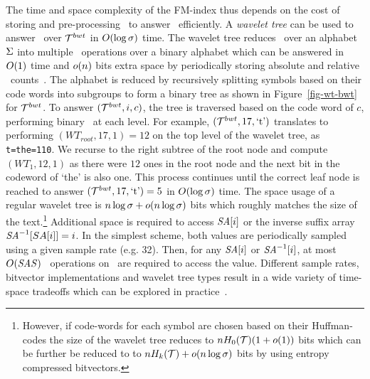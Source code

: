The time and space complexity of the FM-index thus depends on the cost of storing
and pre-processing \colbwt\ to answer \rankop\ efficiently. A {\it wavelet tree}
can be used to answer \rankop\ over $\mathcal{T}^{bwt}$ in $O(\log \sigma)$ time.
The wavelet tree reduces \rankop\ over an alphabet $\Sigma$ into multiple
\rankop\ operations over a binary alphabet which can be answered 
in $O(1)$ time and $o(n)$ bits extra space by periodically storing absolute
and relative \rankop\ counts~\cite{m-fsttcs96}. The alphabet is
reduced by recursively splitting symbols based on their code words into subgroups to 
form a binary tree as shown in Figure~\ref{fig-wt-bwt} for $\mathcal{T}^{bwt}$. To answer
\rankop$(\mathcal{T}^{bwt},i,c)$, the tree is traversed based on the code word of $c$, performing
binary \rankop\ at each level. For example, \rankop$(\mathcal{T}^{bwt},17,\text{`t'})$ translates
to performing \rankop$(WT_{root},17,1)=12$ on the top level of the wavelet 
tree, as {\tt t=the=110}. We recurse to the right subtree of the root node and
compute \rankop$(WT_{1},12,1)$ as there were $12$ ones in the root node and
the next bit in the codeword of `the' is also one. This process continues until 
the correct leaf node is reached to answer \rankop$(\mathcal{T}^{bwt},17,\text{`t'})=5$ in 
$O(\log \sigma)$ time. The space usage of a regular wavelet tree is
$n \log \sigma + o(n \log \sigma)$ bits which roughly
matches the size of the text.\footnote{However, if code-words for each symbol are chosen
based on their Huffman-codes the size of the wavelet tree reduces to $nH_0(\mathcal{T})(1 + o(1))$
bits which can be further be reduced to to $n H_k(\mathcal{T})+o(n \log \sigma)$ bits by using 
entropy compressed bitvectors.} Additional space is required to access $\mbox{\emph{SA}}[i]$
or the inverse suffix array $\mbox{\emph{SA}}^{-1}[SA[i]]=i$. In the simplest scheme, both 
values are periodically sampled using a given sample rate \SASAMPLE (e.g. 32). Then, 
for any $\mbox{\emph{SA}}[i]$ or $\mbox{\emph{SA}}^{-1}[i]$, at most $O(\mbox{\emph{SAS}})$ \rankop\
operations on \colbwt\ are required to access the value.
Different sample rates, bitvector implementations and wavelet tree types result
in a wide variety of time-space tradeoffs which can be explored 
in practice~\cite{gbmp2014sea}.


